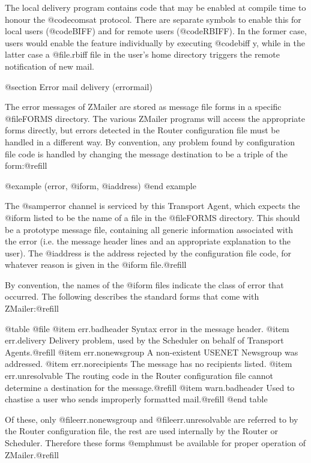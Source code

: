 {{The local delivery program contains code that may be enabled at compile time
to honour the @code{comsat} protocol.  There are separate symbols to enable
this for local users (@code{BIFF}) and for remote users (@code{RBIFF}).
In the former case, users would enable the feature individually by executing
@code{biff y}, while in the latter case a @file{.rbiff} file in the user's
home directory triggers the remote notification of new mail.

@section Error mail delivery (errormail)

The error messages of ZMailer are stored as message file forms in a
specific @file{FORMS} directory.  The various ZMailer programs will access
the appropriate forms directly, but errors detected in the Router
configuration file must be handled in a different way.  By convention,
any problem found by configuration file code is handled by changing the
message destination to be a triple of the form:@refill

@example
(error, @i{form}, @i{address})
@end example

The @samp{error} channel is serviced by this Transport Agent, which expects
the @i{form} listed to be the name of a file in the @file{FORMS} directory.
This should be a prototype message file, containing all generic information
associated with the error (i.e. the message header lines and an appropriate
explanation to the user).  The @i{address} is the address rejected by the
configuration file code, for whatever reason is given in the @i{form}
file.@refill

By convention, the names of the @i{form} files indicate the class of error
that occurred.  The following describes the standard forms that come with
ZMailer:@refill

@table @file
@item err.badheader
Syntax error in the message header.
@item err.delivery
Delivery problem, used by the Scheduler on behalf of Transport Agents.@refill
@item err.nonewsgroup
A non-existent USENET Newsgroup was addressed.
@item err.norecipients
The message has no recipients listed.
@item err.unresolvable
The routing code in the Router configuration file cannot determine a
destination for the message.@refill
@item warn.badheader
Used to chastise a user who sends improperly formatted mail.@refill
@end table

Of these, only @file{err.nonewsgroup} and @file{err.unresolvable} are
referred to by the Router configuration file, the rest are used internally by
the Router or Scheduler.  Therefore these forms @emph{must} be available for
proper operation of ZMailer.@refill

}}
